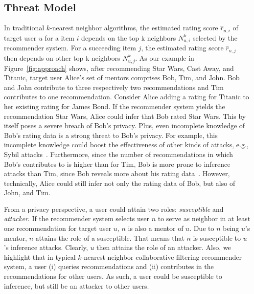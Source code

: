 \documentclass[manuscript,review,anonymous]{acmart}
\begin{document}
\subsection{Threat Model}
In traditional $k$-nearest neighbor algorithms, the estimated rating score $\hat{r}_{u, i}$ of target user $u$ for a item $i$ depends on the top k neighbors $N^k_{u, i}$ selected by the recommender system.
For a succeeding item $j$, the estimated rating score $\hat{r}_{u, j}$ then depends on other top k neighbors $N^k_{u, j}$.
As our example in Figure~\ref{fig:approach} shows, after recommending Star Wars, Cast Away, and Titanic, target user Alice's set of mentors comprises Bob, Tim, and John.
Bob and John contribute to three respectively two recommendations and Tim contributes to one recommendation. 
Consider Alice adding a rating for Titanic to her existing rating for James Bond.
If the recommender system yields the recommendation Star Wars, Alice could infer that Bob rated Star Wars. 
This by itself poses a severe breach of Bob's privacy.
Plus, even incomplete knowledge of Bob's rating data is a strong threat to Bob's privacy.
For example, this incomplete knowledge could boost the effectiveness of other kinds of attacks, e.g., Sybil attacks~\cite{calandrino2011you}.
Furthermore, since the number of recommendations in which Bob's contributes to is higher than for Tim, Bob is more prone to inference attacks than Tim, since Bob reveals more about his rating data~\cite{ramakrishnan2001being}.
However, technically, Alice could still infer not only the rating data of Bob, but also of John, and Tim.

From a privacy perspective, a user could attain two roles: \emph{susceptible} and \emph{attacker}.
If the recommender system selects user $n$ to serve as neighbor in at least one recommendation for target user $u$, $n$ is also a mentor of $u$.
Due to $n$ being $u$'s mentor, $n$ attains the role of a susceptible.
That means that $n$ is susceptible to $u$'s inference attacks.
Clearly, $u$ then attains the role of an attacker.
Also, we highlight that in typical $k$-nearest neighbor collaborative filtering recommender system, a user (i) queries recommendations and (ii) contributes in the recommendations for other users.
As such, a user could be susceptible to inference, but still be an attacker to other users.
\end{document}
